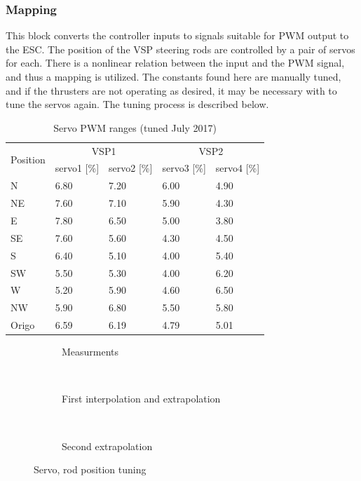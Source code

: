 \subsubsection{Mapping}
This block converts the controller inputs to signals suitable for PWM output to the ESC. The position of the VSP steering rods are controlled by a pair of servos for each. There is a nonlinear relation between the input and the PWM signal, and thus a mapping is utilized. The constants found here are manually tuned, and if the thrusters are not operating as desired, it may be necessary with to tune the servos again. The tuning process is described below. 

\begin{table}[h!]
	\caption{Servo PWM ranges (tuned July 2017)}
	\centering
	\begin{tabular}{lllll}
		\toprule 
		\multirow{2}{*}{Position} & \multicolumn{2}{c}{VSP1} & \multicolumn{2}{c}{VSP2}\tabularnewline
		\cmidrule{2-5} 
		& servo1 {[}\%{]} & servo2 {[}\%{]} & servo3 {[}\%{]} & servo4 {[}\%{]}\tabularnewline
		\midrule
		N & 6.80 & 7.20 & 6.00 & 4.90\tabularnewline
		NE & 7.60 & 7.10 & 5.90 & 4.30\tabularnewline
		E & 7.80 & 6.50 & 5.00 & 3.80\tabularnewline
		SE & 7.60 & 5.60 & 4.30 & 4.50\tabularnewline
		S & 6.40 & 5.10 & 4.00 & 5.40\tabularnewline
		SW & 5.50 & 5.30 & 4.00 & 6.20\tabularnewline
		W & 5.20 & 5.90 & 4.60 & 6.50\tabularnewline
		NW & 5.90 & 6.80 & 5.50 & 5.80\tabularnewline
		\midrule
		Origo & 6.59 & 6.19 & 4.79 & 5.01\tabularnewline
	\end{tabular}
	\label{tab: CSE1 servo ranges} 
\end{table}

\begin{figure}[htb!]
	\centering
	
	\begin{subfigure}{.3\textwidth}
		\centering{}\caption{Measurments}\label{fig: Servo measurements}\end{subfigure}
	~
	\begin{subfigure}{.3\textwidth}
		\centering{}\caption{First interpolation and extrapolation}\label{fig: Servo first extrapolation}\end{subfigure}
	~
	\begin{subfigure}{.3\textwidth}
		\centering{}\caption{Second extrapolation}\label{fig: Servo second extrapolation}\end{subfigure}
	
	\caption{Servo, rod position tuning}
\end{figure}

